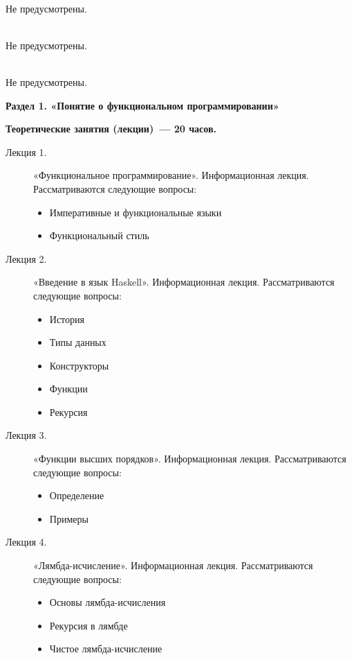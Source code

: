 \\
Не предусмотрены.

\\
Не предусмотрены.

\\
Не предусмотрены.


\textbf{Раздел 1. «Понятие о функциональном программировании»}

{\parindent0pt

\textbf{Теоретические занятия (лекции)~— 20 часов.}
\begin{description}
\item[Лекция 1.] «Функциональное программирование». Информационная лекция. Рассматриваются следующие вопросы: \begin{itemize}
\item Императивные и функциональные языки\item Функциональный стиль
\end{itemize}\item[Лекция 2.] «Введение в язык Haskell». Информационная лекция. Рассматриваются следующие вопросы: \begin{itemize}
\item История\item Типы данных\item Конструкторы\item Функции\item Рекурсия
\end{itemize}\item[Лекция 3.] «Функции высших порядков». Информационная лекция. Рассматриваются следующие вопросы: \begin{itemize}
\item Определение\item Примеры
\end{itemize}\item[Лекция 4.] «Лямбда-исчисление». Информационная лекция. Рассматриваются следующие вопросы: \begin{itemize}
\item Основы лямбда-исчисления\item Рекурсия в лямбде\item Чистое лямбда-исчисление
\end{itemize}
\end{description}




}
